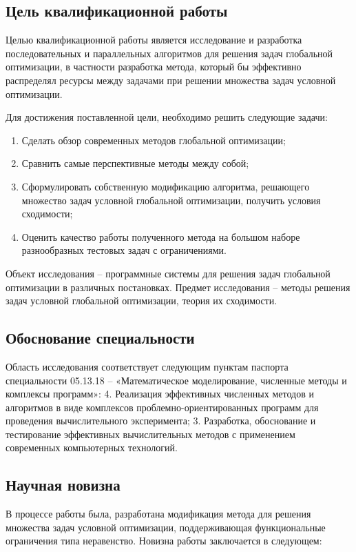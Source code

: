 \subsection*{Цель квалификационной работы}

Целью квалификационной работы является исследование и разработка последовательных и параллельных алгоритмов для
решения задач глобальной оптимизации, в частности разработка метода, который бы эффективно распределял ресурсы между задачами при
решении множества задач условной оптимизации.

Для достижения поставленной цели, необходимо решить следующие задачи:
\begin{enumerate}
    \item Сделать обзор современных методов глобальной оптимизации;
    \item Сравнить самые перспективные методы между собой;
    \item Сформулировать собственную модификацию алгоритма, решающего множество задач условной глобальной оптимизации,
    получить условия сходимости;
    \item Оценить качество работы полученного метода на большом наборе разнообразных тестовых задач с ограничениями.
\end{enumerate}

Объект исследования -- программные системы для решения задач глобальной оптимизации в различных постановках.
Предмет исследования -- методы решения задач условной глобальной оптимизации, теория их сходимости.

\subsection*{Обоснование специальности}

Область исследования соответствует следующим пунктам паспорта специальности 05.13.18 --
«Математическое моделирование, численные методы и комплексы программ»:
4. Реализация эффективных численных методов и алгоритмов в виде
комплексов проблемно-ориентированных программ для проведения
вычислительного эксперимента; 3. Разработка, обоснование и тестирование эффективных вычислительных
методов с применением современных компьютерных технологий.

\subsection*{Научная новизна}

В процессе работы была, разработана модификация метода для решения множества задач условной оптимизации, поддерживающая
функциональные ограничения типа неравенство.
Новизна работы заключается в следующем:

